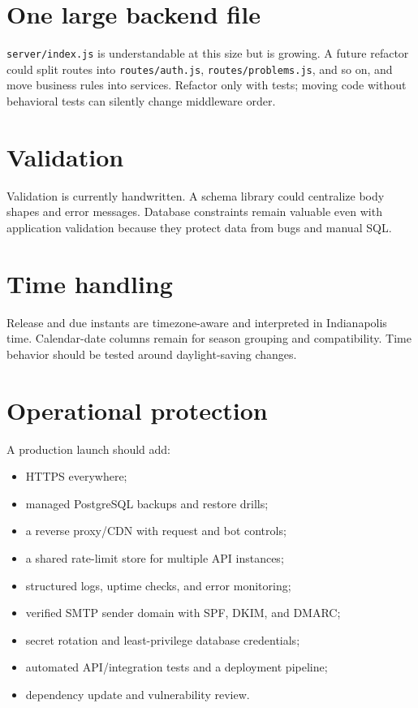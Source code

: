 \documentclass[11pt,oneside]{book}
\newcommand{\file}[1]{\texttt{#1}}
\begin{document}
\section{One large backend file}
\file{server/index.js} is understandable at this size but is growing. A future refactor could split routes into \file{routes/auth.js}, \file{routes/problems.js}, and so on, and move business rules into services. Refactor only with tests; moving code without behavioral tests can silently change middleware order.

\section{Validation}
Validation is currently handwritten. A schema library could centralize body shapes and error messages. Database constraints remain valuable even with application validation because they protect data from bugs and manual SQL.

\section{Time handling}
Release and due instants are timezone-aware and interpreted in Indianapolis time. Calendar-date columns remain for season grouping and compatibility. Time behavior should be tested around daylight-saving changes.

\section{Operational protection}
A production launch should add:
\begin{itemize}
  \item HTTPS everywhere;
  \item managed PostgreSQL backups and restore drills;
  \item a reverse proxy/CDN with request and bot controls;
  \item a shared rate-limit store for multiple API instances;
  \item structured logs, uptime checks, and error monitoring;
  \item verified SMTP sender domain with SPF, DKIM, and DMARC;
  \item secret rotation and least-privilege database credentials;
  \item automated API/integration tests and a deployment pipeline;
  \item dependency update and vulnerability review.
\end{itemize}
\end{document}
